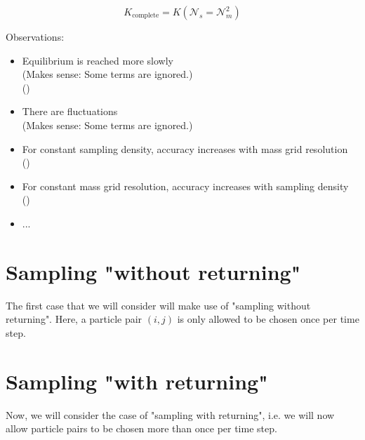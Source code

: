     $$K_\text{complete}=K(\mathcal{N}_s=\mathcal{N}_m^2)$$

    Observations:
    \begin{itemize}
        \item Equilibrium is reached more slowly \\ 
            (Makes sense: Some terms are ignored.) \\
            ()
        \item There are fluctuations \\ 
            (Makes sense: Some terms are ignored.)
        \item For constant sampling density, accuracy increases with mass grid resolution \\
            ()
        \item For constant mass grid resolution, accuracy increases with sampling density \\
            ()
        \item ...
    \end{itemize}

\section{Sampling "without returning"}

    The first case that we will consider will make use of "sampling without returning". Here, a 
    particle pair $(i, j)$ is only allowed to be chosen once per time step.

\section{Sampling "with returning"}

    Now, we will consider the case of "sampling with returning", i.e. we will now allow particle 
    pairs to be chosen more than once per time step.


